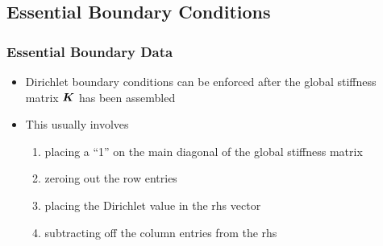 \subsection{Essential Boundary Conditions}
\begin{frame}[t]
  \frametitle{Essential Boundary Data}
  \vspace{-.2in}
  \begin{block}{
    }
  \begin{itemize}
  \item {Dirichlet boundary conditions can be enforced after 
    the global stiffness matrix ${\boldsymbol{K}}$ has been assembled}
  \item This usually involves
    \begin{enumerate}
    \item<1-> placing a ``1'' on the main diagonal of the
      global stiffness matrix
    \item<2-> zeroing out the row entries
    \item<3-> placing the Dirichlet
      value in the rhs vector
    \item<4-> subtracting off the column entries from the rhs
    \end{enumerate}
  \end{itemize}
  \end{block}

\end{frame}



